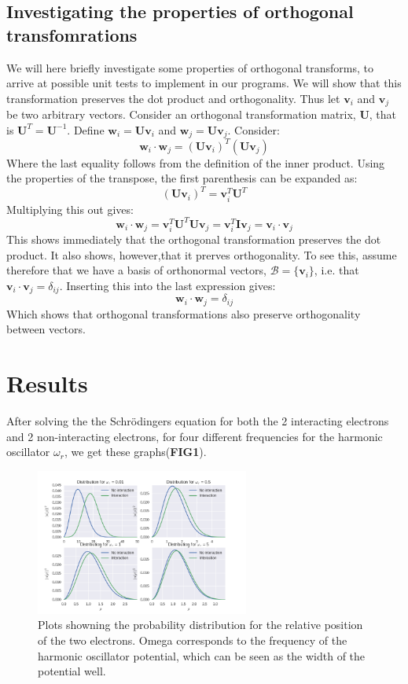 \documentclass[a4paper, 10pt]{article}
\begin{document}
\subsection{Investigating the properties of orthogonal transfomrations}
We will here briefly investigate some properties of orthogonal transforms, to arrive at possible unit tests to implement in our programs. 
We will show that this transformation preserves the dot product and orthogonality. Thus let $\mathbf{v}_i$ and $\mathbf{v}_j$ be two arbitrary vectors. Consider an orthogonal transformation matrix, $\mathbf{U}$, that is $\mathbf{U}^T=\mathbf{U}^{-1}$. Define $\mathbf{w}_i=\mathbf{U}\mathbf{v}_i$ and $\mathbf{w}_j=\mathbf{U}\mathbf{v}_j$. Consider:
$$\mathbf{w}_i \cdot \mathbf{w}_j=\left(\mathbf{U}\mathbf{v}_i\right)^T\left(\mathbf{U}\mathbf{v}_j\right)$$
Where the last equality follows from the definition of the inner product. Using the properties of the transpose, the first parenthesis can be expanded as:
$$\left(\mathbf{U}\mathbf{v}_i\right)^T = \mathbf{v}_i^T\mathbf{U}^T$$
Multiplying this out gives:
$$\mathbf{w}_i\cdot \mathbf{w}_j=\mathbf{v}_i^T\mathbf{U}^T\mathbf{U}\mathbf{v}_j=
\mathbf{v}_i^T\mathbf{I}\mathbf{v}_j=\mathbf{v}_i\cdot \mathbf{v}_j$$
This shows immediately that the orthogonal transformation preserves the dot product. It also shows, however,that it prerves orthogonality. To see this, assume therefore that we have a basis of orthonormal vectors, $\mathcal{B}=\{\mathbf{v}_i\}$, i.e. that $\mathbf{v}_i\cdot \mathbf{v}_j=\delta_{ij}$. Inserting this into the last expression gives:
$$\mathbf{w}_i\cdot \mathbf{w}_j=\delta_{ij}$$
Which shows that orthogonal transformations also preserve orthogonality between vectors.


\section{Results}

After solving the the Schrödingers equation for both the 2 interacting electrons and 2 non-interacting electrons, for four different frequencies for the harmonic oscillator $\omega_r$, we get these graphs(\textbf{FIG1}).\\

\begin{figure}
\begin{center}
\includegraphics[width=70mm]{distribution_subplot.png}
\caption{Plots showning the probability distribution for the relative position of the two electrons. Omega corresponds to the frequency of the harmonic oscillator potential, which can be seen as the width of the potential well.}\label{fig:finfigur}
\end{center}
\end{figure}
\end{document}
